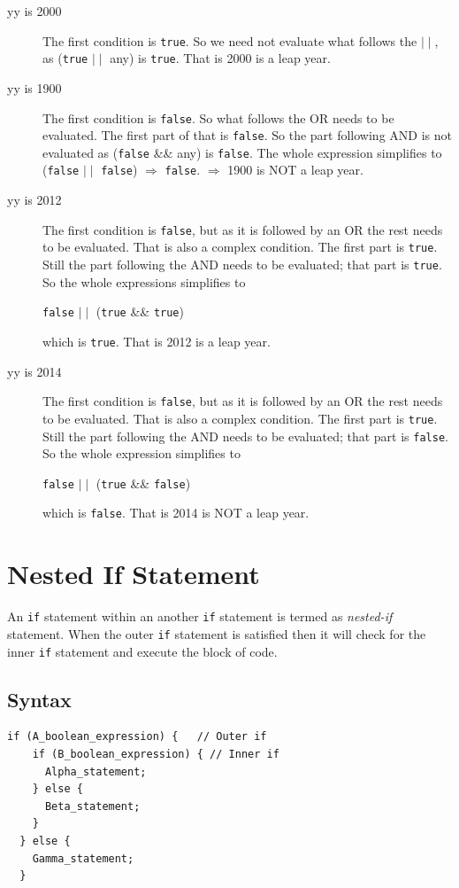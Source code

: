\documentclass[11pt,a4paper]{article}
\begin{document}
\begin{description}
\item[yy is 2000] The first condition is \texttt{true}. So we need not evaluate what follows the $\mid\mid$, as (\texttt{true} $\mid\mid$ any) is \texttt{true}. That is 2000 is a leap year.

\item[yy is 1900] The first condition is \texttt{false}. So what follows the OR needs to be evaluated. The first part of that is \texttt{false}. So the part following AND is not evaluated as (\texttt{false} \&\& any) is \texttt{false}. The whole expression simplifies to (\texttt{false} $\mid\mid$ \texttt{false}) $\Rightarrow$ \texttt{false}. $\Rightarrow$ 1900 is NOT a leap year.

\item[yy is 2012] The first condition is \texttt{false}, but as it is followed by an OR the rest needs to be evaluated. That is also a complex condition. The first part is \texttt{true}. Still the part following the AND needs to be evaluated; that part is \texttt{true}. So the whole expressions simplifies to 

\texttt{false} $\mid\mid$ (\texttt{true} \&\& \texttt{true}) 

which is \texttt{true}. That is 2012 is a leap year.

\item[yy is 2014] The first condition is \texttt{false}, but as it is followed by an OR the rest needs to be evaluated. That is also a complex condition. The first part is \texttt{true}. Still the part following the AND needs to be evaluated; that part is \texttt{false}. So the whole expression simplifies to

\texttt{false} $\mid\mid$ (\texttt{true} \&\& \texttt{false}) 

which is \texttt{false}. That is 2014 is NOT a leap year.
\end{description}

\section*{Nested If Statement}

An \lstinline!if! statement within an another \lstinline!if! statement is termed as \emph{nested-if} statement. When the outer \lstinline!if! statement is satisfied then it will check for the inner \lstinline!if! statement and execute the block of code.

\subsection*{Syntax}
\begin{lstlisting}[numbers=none]
  if (A_boolean_expression) {   // Outer if 
    if (B_boolean_expression) { // Inner if 
      Alpha_statement;
    } else {
      Beta_statement;
    }
  } else {
    Gamma_statement;
  }
\end{lstlisting}
\end{document}
